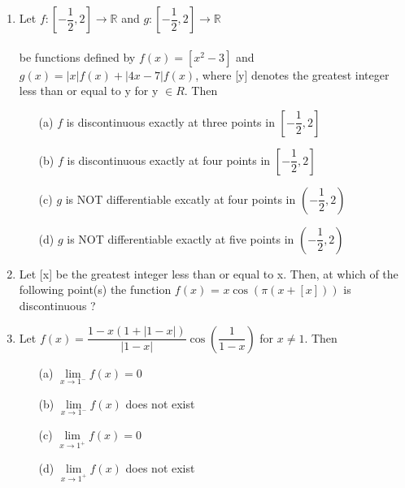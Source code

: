 \documentclass[journal,12pt,twocolumn]{IEEEtran}
\begin{document}
\begin{enumerate}
\item Let $f:\left[-\dfrac{1}{2},2\right] \to \mathbb{R}$ and $g:\left[-\dfrac{1}{2},2\right] \to \mathbb{R}$\\
\\ be functions defined by $f(x)=[x^2-3]$ and $g(x)=|x|f(x)+|4x-7|f(x)$, where [y] denotes the greatest integer less than or equal to y for y $\in R$. Then
\begin{itemize}
\item[(a)] $f$ is discontinuous exactly at three points in $\left[-\dfrac{1}{2},2\right]$\\
\item[(b)] $f$ is discontinuous exactly at four points in $\left[-\dfrac{1}{2},2\right]$\\
\item[(c)] $g$ is NOT differentiable excatly at four points in $\left(-\dfrac{1}{2},2\right)$\\
\item[(d)] $g$ is NOT differentiable exactly at five points in $\left(-\dfrac{1}{2},2\right)$\\
\end{itemize}

\item Let [x] be the greatest integer less than or equal to x. Then, at which of the following point(s) the function $f(x)$ = $x\cos(\pi(x+[x]))$ is discontinuous ?
\begin{itemize}
\end{itemize}

\item Let \resizebox{.33 \textwidth}{!} 
{$f(x)=\dfrac{1-x(1+|1-x|)}{|1-x|}\cos\left(\dfrac{1}{1-x}\right)$} for $x\neq 1$. Then
\begin{itemize}
\item[(a)] $\lim\limits_{x \to 1^-}f(x)=0$\\
\item[(b)] $\lim\limits_{x \to 1^-}f(x)$ does not exist\\
\item[(c)] $\lim\limits_{x \to 1^+}f(x)=0$\\
\item[(d)] $\lim\limits_{x \to 1^+}f(x)$ does not exist\\
\end{itemize}


\end{enumerate}
\end{document}
